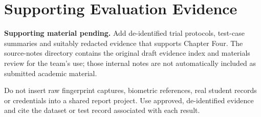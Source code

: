 \chapter{Supporting Evaluation Evidence}\label{app:evidence}
\textbf{Supporting material pending.} Add de-identified trial protocols,
test-case summaries and suitably redacted evidence that supports Chapter Four.
The source-notes directory contains the original draft evidence index and
materials review for the team's use; those internal notes are not automatically
included as submitted academic material.

Do not insert raw fingerprint captures, biometric references, real student
records or credentials into a shared report project. Use approved, de-identified
evidence and cite the dataset or test record associated with each result.
